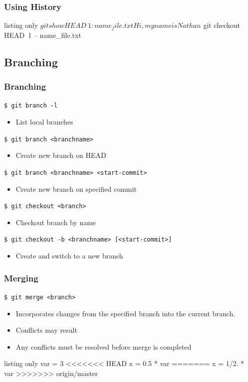 \documentclass[english,compress]{beamer}
\begin{document}
\begin{frame}[fragile]
    \frametitle{Using History}
    \begin{tcblisting}{listing only}
$ git show HEAD~1:name_file.txt 
Hi, my name is Nathan
$ git checkout HEAD~1 -- name_file.txt
    \end{tcblisting}
\end{frame}

\subsection{Branching}
\begin{frame}[fragile]
    \frametitle{Branching}

    \verb|$ git branch -l|
    \begin{itemize}
        \item List local branches
    \end{itemize}

    \verb|$ git branch <branchname> |
    \begin{itemize}
        \item Create new branch on HEAD
    \end{itemize}

    \verb|$ git branch <branchname> <start-commit>|
    \begin{itemize}
        \item Create new branch on specified commit
    \end{itemize}

    \verb|$ git checkout <branch>|
    \begin{itemize}
        \item Checkout branch by name
    \end{itemize}

    \verb|$ git checkout -b <branchname> [<start-commit>]|
    \begin{itemize}
        \item Create and switch to a new branch
    \end{itemize}
\end{frame}

\begin{frame}[fragile]
    \frametitle{Merging}

    \verb|$ git merge <branch>|
    \begin{itemize}
        \item Incorporates changes from the specified branch into the current
            branch.
        \item Conflicts may result
        \item Any conflicts must be resolved before merge is completed
    \end{itemize}

    \begin{tcblisting}{listing only}
var = 3
<<<<<<< HEAD
x = 0.5 * var
=======
x = 1/2. * var
>>>>>>> origin/master
    \end{tcblisting}
\end{frame}
\end{document}
